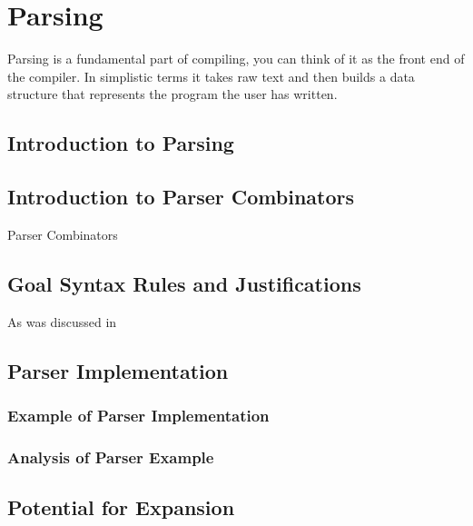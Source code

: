 
\chapter{Parsing}

Parsing is a fundamental part of compiling, you can think of it as the front end of the compiler. In simplistic terms it takes raw text and then builds a data structure that represents the program the user has written.     
 
\section{Introduction to Parsing}

\section{Introduction to Parser Combinators}

Parser Combinators 

\section{Goal Syntax Rules and Justifications}

As was discussed in 

\section{Parser Implementation}

\subsection{Example of Parser Implementation}

\subsection{Analysis of Parser Example}

\section{Potential for Expansion}